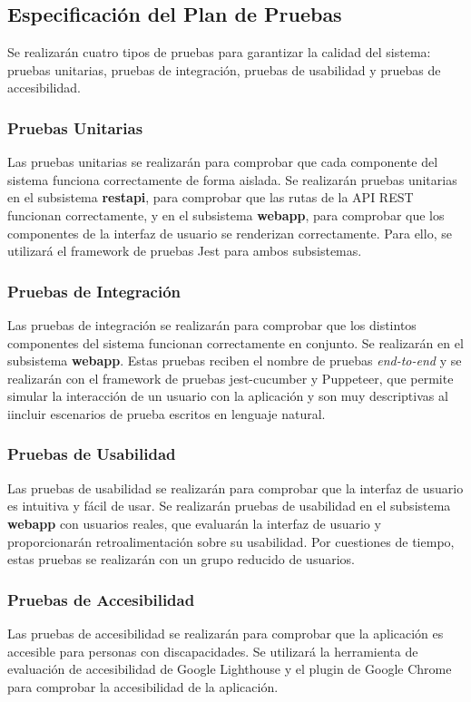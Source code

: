 \subsection{Especificación del Plan de Pruebas}
Se realizarán cuatro tipos de pruebas para garantizar la calidad del sistema: pruebas unitarias, pruebas de integración, pruebas de usabilidad y pruebas de accesibilidad.
\subsubsection{Pruebas Unitarias}
Las pruebas unitarias se realizarán para comprobar que cada componente del sistema funciona correctamente de forma aislada.
Se realizarán pruebas unitarias en el subsistema \textbf{restapi}, para comprobar que las rutas de la API REST funcionan correctamente, y en el subsistema \textbf{webapp}, para comprobar que los componentes de la interfaz de usuario se renderizan correctamente.
Para ello, se utilizará el framework de pruebas Jest para ambos subsistemas.

\subsubsection{Pruebas de Integración}
Las pruebas de integración se realizarán para comprobar que los distintos componentes del sistema funcionan correctamente en conjunto.
Se realizarán en el subsistema \textbf{webapp}. Estas pruebas reciben el nombre de pruebas \textit{end-to-end} y se realizarán con el framework de 
pruebas jest-cucumber y Puppeteer, que permite simular la interacción de un usuario con la aplicación y son muy descriptivas al iincluir escenarios de prueba escritos en lenguaje natural.

\subsubsection{Pruebas de Usabilidad}
Las pruebas de usabilidad se realizarán para comprobar que la interfaz de usuario es intuitiva y fácil de usar.
Se realizarán pruebas de usabilidad en el subsistema \textbf{webapp} con usuarios reales, que evaluarán la interfaz de usuario y proporcionarán retroalimentación sobre su usabilidad.
Por cuestiones de tiempo, estas pruebas se realizarán con un grupo reducido de usuarios.

\subsubsection{Pruebas de Accesibilidad}
Las pruebas de accesibilidad se realizarán para comprobar que la aplicación es accesible para personas con discapacidades.
Se utilizará la herramienta de evaluación de accesibilidad de Google Lighthouse y el plugin de Google Chrome 
 para comprobar la accesibilidad de la aplicación.


